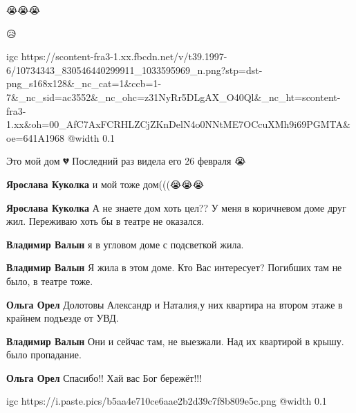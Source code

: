  
 
 
 
 

\qqSecCmt


😭😭😭


😥


\ifcmt
  igc https://scontent-fra3-1.xx.fbcdn.net/v/t39.1997-6/10734343_830546440299911_1033595969_n.png?stp=dst-png_s168x128&_nc_cat=1&ccb=1-7&_nc_sid=ac3552&_nc_ohc=z31NyRr5DLgAX_O40Ql&_nc_ht=scontent-fra3-1.xx&oh=00_AfC7AxFCRHLZCjZKnDelN4o0NNtME7OCcuXMh9i69PGMTA&oe=641A1968
	@width 0.1
\fi


Это мой дом 💔 Последний раз видела его 26 февраля 😭

\begin{itemize} %
\textbf{Ярослава Куколка} и мой тоже дом(((😭😭😭

\textbf{Ярослава Куколка} А не знаете дом хоть цел?? У меня в коричневом доме друг жил. Переживаю хоть бы в театре не оказался.

\textbf{Владимир Валын} я в угловом доме с подсветкой жила.

\textbf{Владимир Валын} Я жила в этом доме. Кто Вас интересует? Погибших там не было, в театре тоже.

\textbf{Ольга Орел} Долотовы Александр и Наталия,у них квартира на втором этаже в крайнем подъезде от УВД.

\textbf{Владимир Валын} Они и сейчас там, не выезжали. Над их квартирой в крышу. было пропадание.

\textbf{Ольга Орел} Спасибо!!
Хай вас Бог бережёт!!!

\end{itemize} %


\ifcmt
  igc https://i.paste.pics/b5aa4e710ce6aae2b2d39c7f8b809e5c.png
	@width 0.1
\fi

